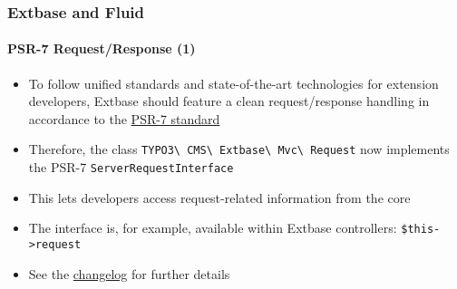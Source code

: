 %

\begin{frame}[fragile]
	\frametitle{Extbase and Fluid}
	\framesubtitle{PSR-7 Request/Response (1)}

	\begin{itemize}
		\item To follow unified standards and state-of-the-art technologies for
			extension developers, Extbase should feature a clean request/response
			handling in accordance to the
			\href{https://www.php-fig.org/psr/psr-7/}{PSR-7 standard}
		\item Therefore, the class
			\small\texttt{TYPO3\textbackslash
				CMS\textbackslash
				Extbase\textbackslash
				Mvc\textbackslash
				Request}\normalsize\newline
			now implements the PSR-7
			\texttt{ServerRequestInterface}
		\item This lets developers access request-related information from the core
		\item The interface is, for example, available within Extbase controllers:\newline
			\texttt{\$this->request}
		\item See the
			\href{https://docs.typo3.org/c/typo3/cms-core/master/en-us/Changelog/11.3/Feature-94428-ExtbaseRequestImplementsServerRequestInterface.html}{changelog}
			for further details
	\end{itemize}

\end{frame}

